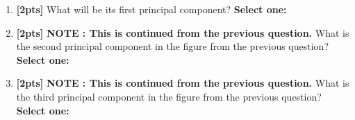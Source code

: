 \begin{enumerate}
\item \textbf{[2pts]} What will be its first principal component? %
    \textbf{Select one:}
    
    \item \textbf{[2pts]} \textbf{NOTE : This is continued from the previous question.} What is the second principal component in the figure from the previous question? %
    \textbf{Select one:}
    \item \textbf{[2pts]} \textbf{NOTE : This is continued from the previous question.}
What is the third principal component in the figure from the previous question?
     \textbf{Select one:}

\end{enumerate}
\clearpage